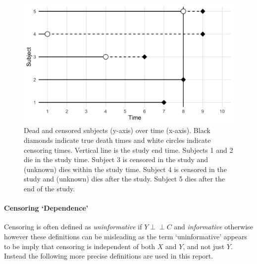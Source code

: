 \documentclass[
  letterpaper,
]{scrbook}
\let\oldparagraph\paragraph
\renewcommand{\paragraph}[1]{\oldparagraph{#1}\mbox{}}
\theoremstyle{plain}
\theoremstyle{definition}
\theoremstyle{remark}
\begin{document}
\begin{figure}

{\centering \includegraphics{./images/survival/censoring.png}

}

\caption{\label{fig-survset-censor}Dead and censored subjects (y-axis)
over time (x-axis). Black diamonds indicate true death times and white
circles indicate censoring times. Vertical line is the study end time.
Subjects 1 and 2 die in the study time. Subject 3 is censored in the
study and (unknown) dies within the study time. Subject 4 is censored in
the study and (unknown) dies after the study. Subject 5 dies after the
end of the study.}

\end{figure}

\paragraph{Censoring `Dependence'}

Censoring is often defined as \emph{uninformative} if
\(Y \perp \!\!\! \perp C\) and \emph{informative} otherwise however
these definitions can be misleading as the term `uninformative' appears
to be imply that censoring is independent of both \(X\) and \(Y\), and
not just \(Y\). Instead the following more precise definitions are used
in this report.
\end{document}
